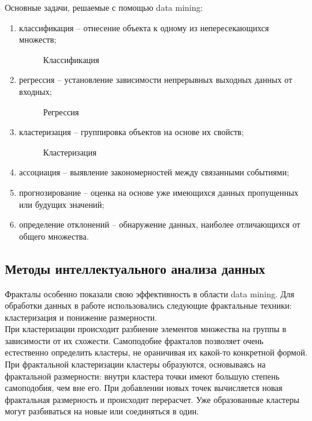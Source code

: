 Основные задачи, решаемые с помощью data mining:
\begin{enumerate}
\item классификация – отнесение объекта к одному из непересекающихся множеств;

\begin{figure}[H]
\caption{Классификация}
\end{figure}

\item регрессия – установление зависимости непрерывных выходных данных от входных;

\begin{figure}[H]
\caption{Регрессия}
\end{figure}


\item кластеризация – группировка объектов на основе их свойств;

\begin{figure}[H]
\caption{Кластеризация}
\end{figure}

\item ассоциация – выявление закономерностей между связанными событиями;

\item прогнозирование – оценка на основе уже имеющихся данных пропущенных или будущих значений;  

\item определение отклонений  – обнаружение данных, наиболее отличающихся от общего множества.
\end{enumerate}


\pagebreak
\subsection{Методы интеллектуального анализа данных}

Фракталы особенно показали свою эффективность в области data mining. Для обработки данных в работе использовались следующие фрактальные техники: кластеризация и понижение размерности.
\\

При кластеризации происходит разбиение элементов множества на группы в зависимости от их схожести. Самоподобие фракталов позволяет очень естественно определить кластеры, не ораничивая их какой-то конкретной формой.  При фрактальной кластеризации кластеры образуются, основываясь на фрактальной размерности: внутри кластера точки имеют большую степень самоподобия, чем вне его. При добавлении новых точек вычисляется новая фрактальная размерность и происходит перерасчет. Уже образованные кластеры могут разбиваться на новые или соединяться в один.
\\

